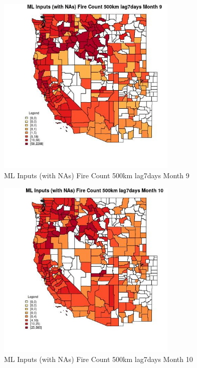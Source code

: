 \clearpage 

\begin{figure} 
\centering  
\includegraphics[width=0.77\textwidth]{Code_Outputs/Report_ML_input_PM25_Step4_part_e_de_duplicated_aves_compiled_2019-05-21wNAs_CountyFire_Count_500km_lag7daysmedianMonth9.jpg} 
\caption{\label{fig:Report_ML_input_PM25_Step4_part_e_de_duplicated_aves_compiled_2019-05-21wNAsCountyFire_Count_500km_lag7daysmedianMonth9}ML Inputs (with NAs) Fire Count 500km lag7days Month 9} 
\end{figure} 
 

\begin{figure} 
\centering  
\includegraphics[width=0.77\textwidth]{Code_Outputs/Report_ML_input_PM25_Step4_part_e_de_duplicated_aves_compiled_2019-05-21wNAs_CountyFire_Count_500km_lag7daysmedianMonth10.jpg} 
\caption{\label{fig:Report_ML_input_PM25_Step4_part_e_de_duplicated_aves_compiled_2019-05-21wNAsCountyFire_Count_500km_lag7daysmedianMonth10}ML Inputs (with NAs) Fire Count 500km lag7days Month 10} 
\end{figure} 
 

